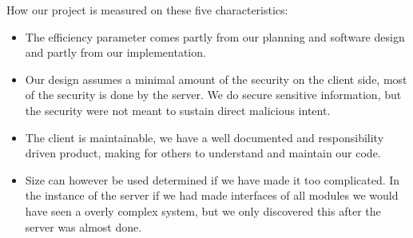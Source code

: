 How our project is measured on these five characteristics:
 \begin{itemize}
 	\item The efficiency parameter comes partly from our planning and software design and partly from our implementation.
 	\item Our design assumes a minimal amount of the security on the client side, most of the security is done by the server. We do secure sensitive information, but the security were not meant to sustain direct malicious intent.
 	\item The client is maintainable, we have a well documented and responsibility driven product, making for others to understand and maintain our code. 
 	\item Size can however be used determined if we have made it too complicated. In the instance of the server if we had made interfaces of all modules we would have seen a overly complex system, but we only discovered this after the server was almost done. 
 \end{itemize}